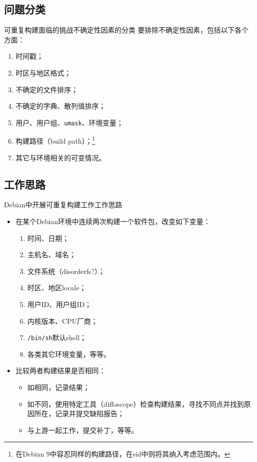 \documentclass{beamer}
\begin{document}
\subsection{问题分类}
\begin{frame}{可重复构建面临的挑战}{不确定性因素的分类}
要排除不确定性因素，包括以下各个方面：

\vspace{1em}
\begin{enumerate}
\item 时间戳；
\item 时区与地区格式；
\item 不确定的文件排序；
\item 不确定的字典、散列值排序；
\item 用户、用户组、\texttt{umask}、环境变量；
\item 构建路径（build path）；\footnote{在Debian 9中容忍同样的构建路径，在sid中则将其纳入考虑范围内。\vspace{1em}}
\item 其它与环境相关的可变情况。
\end{enumerate}
\end{frame}
\subsection{工作思路}
\begin{frame}{Debian中开展可重复构建工作}{工作思路}
\begin{itemize}
\item {在某个Debian环境中连续两次构建一个软件包，改变如下变量：
  \begin{enumerate}
  \item 时间、日期；
  \item 主机名、域名；
  \item 文件系统（disorderfs?）；
  \item 时区、地区locale；
  \item 用户ID、用户组ID；
  \item 内核版本、CPU厂商；
  \item \texttt{/bin/sh}默认shell；
  \item 各类其它环境变量，等等。
  \end{enumerate}
  }
\item {比较两者构建结果是否相同：
  \begin{itemize}
    \item 如相同，记录结果；
    \item 如不同，使用特定工具（diffoscope）检查构建结果，寻找不同点并找到原因所在，记录并提交缺陷报告；
    \item 与上游一起工作，提交补丁，等等。
  \end{itemize}
}
\end{itemize}
\end{frame}
\end{document}

